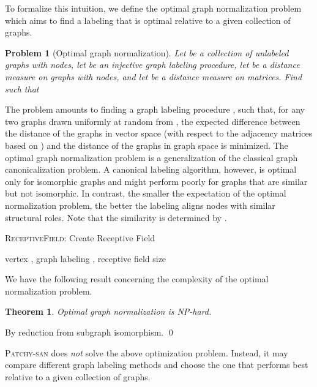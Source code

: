 \documentclass{article}
\newtheorem{problem}{Problem}
\newtheorem{thmx}{Theorem}
\renewenvironment{proof}{{\bf Proof:}}{\qed}
\newcommand{\patchysan}{{\textsc{Patchy-san}}\xspace}
\begin{document}
To formalize this intuition, we define the optimal graph normalization problem which aims to find a labeling that is optimal relative to a given collection of graphs. 


\begin{problem}[Optimal graph normalization]
Let  be a collection of unlabeled graphs with  nodes, let  be an injective graph labeling procedure, let  be a distance measure on graphs with  nodes, and let  be a distance measure on  matrices. Find  such that

\end{problem}
The problem amounts to finding a graph labeling procedure , such that, for any two graphs drawn uniformly at random from , the expected difference between the distance of the graphs in vector space (with respect to the adjacency matrices based on ) and the distance of the graphs in graph space is minimized. The optimal graph normalization problem is a generalization of the classical graph canonicalization problem. A canonical labeling algorithm, however, is optimal only for isomorphic graphs and might perform poorly for graphs that are similar but not isomorphic. In contrast, the smaller the expectation of the optimal normalization problem, the better the labeling aligns nodes with similar structural roles. Note that the similarity is determined by .


\begin{algorithm}[t!]
  \small
   \caption{\textsc{ReceptiveField}: Create Receptive Field}
   \label{alg:example}
\begin{algorithmic}[1]
	 vertex , graph labeling , receptive field size 
   \STATE 
   \STATE 
\end{algorithmic}
\end{algorithm}

We have the following result concerning the complexity of the optimal normalization problem. 
\begin{thmx} \label{thm:normalization_NP}
  Optimal graph normalization is NP-hard.
\end{thmx}
\begin{proof}
By reduction from subgraph isomorphism.
\end{proof}

\patchysan does \emph{not} solve the above optimization problem. Instead, it may compare different graph labeling methods and choose the one that performs best relative to a given collection of graphs.
\end{document}
